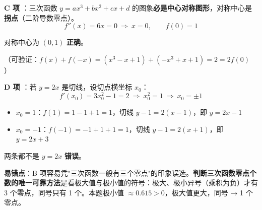 \begin{answer}
\par\medskip

\textbf{C 项 }：三次函数 $y=ax^3+bx^2+cx+d$ 的图象\textbf{必是中心对称图形}，对称中心是\textbf{拐点}（二阶导数零点）。
\nopagebreak[4]
\[f''(x)=6x=0\ \Longrightarrow\ x=0,\qquad f(0)=1\]

对称中心为 $(0,1)$  \textbf{正确}。

（可验证：$f(x)+f(-x)=\left(x^3-x+1\right)+\left(-x^3+x+1\right)=2=2f(0)$ ）

\par\medskip

\textbf{D 项 }：若 $y=2x$ 是切线，设切点横坐标 $x_0$：
\nopagebreak[4]
\[f'\left(x_0\right)=3x_0^{2}-1=2\ \Longrightarrow\ x_0^{2}=1\ \Longrightarrow\ x_0=\pm1\]

\begin{itemize}
\item $x_0=1$：$f(1)=1-1+1=1$，切线 $y-1=2(x-1)$，即 $y=2x-1$
\item $x_0=-1$：$f(-1)=-1+1+1=1$，切线 $y-1=2(x+1)$，即 $y=2x+3$
\end{itemize}

两条都不是 $y=2x$  \textbf{错误}。

\begin{gktip}
\textbf{易错点}：B 项容易凭"三次函数一般有三个零点"的印象误选。\textbf{判断三次函数零点个数的唯一可靠方法}是看极大值与极小值的符号：极大、极小异号（乘积为负）才有 3 个零点，同号只有 1 个。本题极小值 $\approx0.615>0$，极大值更大，同号 → 1 个零点。
\end{gktip}


\par\medskip

\end{answer}
